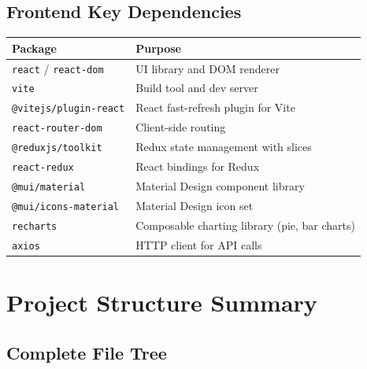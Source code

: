 \documentclass[12pt,a4paper]{report}
\begin{document}
\section{Frontend Key Dependencies}

\begin{longtable}{@{}p{5cm}p{9cm}@{}}
  \toprule
  \textbf{Package} & \textbf{Purpose} \\
  \midrule
  \endhead
  \texttt{react} / \texttt{react-dom} & UI library and DOM renderer \\[3pt]
  \texttt{vite} & Build tool and dev server \\[3pt]
  \texttt{@vitejs/plugin-react} & React fast-refresh plugin for Vite \\[3pt]
  \texttt{react-router-dom} & Client-side routing \\[3pt]
  \texttt{@reduxjs/toolkit} & Redux state management with slices \\[3pt]
  \texttt{react-redux} & React bindings for Redux \\[3pt]
  \texttt{@mui/material} & Material Design component library \\[3pt]
  \texttt{@mui/icons-material} & Material Design icon set \\[3pt]
  \texttt{recharts} & Composable charting library (pie, bar charts) \\[3pt]
  \texttt{axios} & HTTP client for API calls \\
  \bottomrule
\end{longtable}

\chapter{Project Structure Summary}

\section{Complete File Tree}
\end{document}
